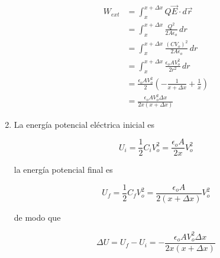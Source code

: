 \begin{enumerate}[label=\alph*)]
    \begin{equation}
    \begin{split}
        W_{ext} &= \int^{x+\Delta x}_x Q\Vec{E}\cdot d\Vec{r}\\
        & = \int^{x+\Delta x}_x \frac{Q^2}{2A\epsilon_o}\,dr\\
        & = \int^{x+\Delta x}_x
        \frac{(CV_o)^2}{2A\epsilon_o}\,dr\\
        & = \int^{x+\Delta x}_x
        \frac{\epsilon_o AV_o^2}{2r^2}\,dr\\
        &=\frac{\epsilon_o AV_o^2}{2}\left(
        -\frac{1}{x+\Delta x}+\frac{1}{x}\right)\\
        &=\frac{\epsilon_o AV_o^2\Delta x}{2x(x+\Delta x)}
    \end{split}
    \nonumber
    \end{equation} 
    
    \medbreak

    \item La energía potencial eléctrica inicial es
    
    \[U_i = \frac{1}{2}C_iV_o^2 = \frac{\epsilon_o A}{2x}V_o^2\]
    
    la energía potencial final es
    
    \[U_f = \frac{1}{2}C_fV_o^2 = 
    \frac{\epsilon_o A}{2(x+\Delta x)}V_o^2\]
    
    de modo que
    
    \[\Delta U = U_f-U_i = -\frac{\epsilon_o AV_o^2\Delta x}{2x(x+\Delta x)}\]
    

\end{enumerate}

\bigbreak
\bigbreak

\newline

